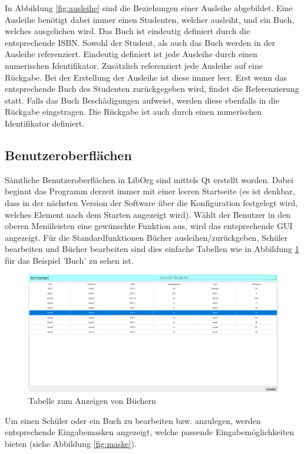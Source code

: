 In Abbildung \ref{fig:ausleihe} sind die Beziehungen einer Ausleihe abgebildet. Eine Ausleihe benötigt dabei immer einen Studenten, welcher ausleiht, und ein Buch, welches ausgeliehen wird. Das Buch ist eindeutig definiert durch die entsprechende ISBN. Sowohl der Student, als auch das Buch werden in der Ausleihe referenziert. Eindeutig definiert ist jede Ausleihe durch einen numerischen Identifikator. Zusätzlich referenziert jede Ausleihe auf eine Rückgabe. Bei der Erstellung der Ausleihe ist diese immer leer. Erst wenn das entsprechende Buch des Studenten zurückgegeben wird, findet die Referenzierung statt. Falls das Buch Beschädigungen aufweist, werden diese ebenfalls in die Rückgabe eingetragen. Die Rückgabe ist auch durch einen numerischen Identifikator definiert.

\subsection{Benutzeroberflächen}
Sämtliche Benutzeroberflächen in LibOrg sind mittels Qt erstellt worden. Dabei beginnt das Programm derzeit immer mit einer leeren Startseite (es ist denkbar, dass in der nächsten Version der Software über die Konfiguration festgelegt wird, welches Element nach dem Starten angezeigt wird). Wählt der Benutzer in den oberen Menüleisten eine gewünschte Funktion aus, wird das entsprechende GUI angezeigt. Für die Standardfunktionen Bücher ausleihen/zurückgeben, Schüler bearbeiten und Bücher bearbeiten sind dies einfache Tabellen wie in Abbildung \ref{fig:tabelle} für das Beispiel 'Buch' zu sehen ist.
\begin{figure}[H]
	\centering
	\includegraphics[width=1\textwidth]{figures/konzept/tabelle.PNG}
	\caption{Tabelle zum Anzeigen von Büchern}
	\label{fig:tabelle}
\end{figure}
Um einen Schüler oder ein Buch zu bearbeiten bzw. anzulegen, werden entsprechende Eingabemasken angezeigt, welche passende Eingabemöglichkeiten bieten (siehe Abbildung \ref{fig:maske}).
